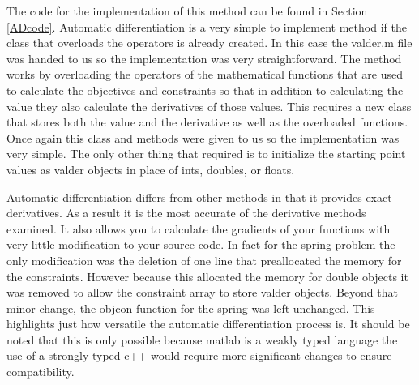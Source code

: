 \documentclass{article}
\begin{document}
The code for the implementation of this method can be found in Section \ref{ADcode}.  Automatic differentiation is a very simple to implement method if the class that overloads the operators is already created.  In this case the valder.m file was handed to us so the implementation was very straightforward.  The method works by overloading the operators of the mathematical functions that are used to calculate the objectives and constraints so that in addition to calculating the value they also calculate the derivatives of those values.  This requires a new class that stores both the value and the derivative as well as the overloaded functions.  Once again this class and methods were given to us so the implementation was very simple.  The only other thing that required is to initialize the starting point values as valder objects in place of ints, doubles, or floats.

Automatic differentiation differs from other methods in that it provides exact derivatives. As a result it is the most accurate of the derivative methods examined.  It also allows you to calculate the gradients of your functions with very little modification to your source code.  In fact for the spring problem the only modification was the deletion of one line that preallocated the memory for the constraints. However because this allocated the memory for double objects it was removed to allow the constraint array to store valder objects.  Beyond that minor change, the objcon function for the spring was left unchanged.  This highlights just how versatile the automatic differentiation process is.  It should be noted that this is only possible because matlab is a weakly typed language the use of a strongly typed c++ would require more significant changes to ensure compatibility.



%
\end{document}

